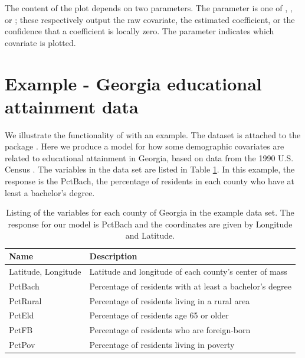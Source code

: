 The content of the plot depends on two parameters. The parameter  is one of , , or ; these respectively output the raw covariate, the estimated coefficient, or the confidence that a coefficient is locally zero. The parameter  indicates which covariate is plotted.

\section{Example - Georgia educational attainment data}
We illustrate the functionality of  with an example. The dataset  is attached to the package . Here we produce a model for how some demographic covariates are related to educational attainment in Georgia, based on data from the 1990 U.S. Census \citep{Fotheringham-Brundson-Charlton-2002}. The variables in the data set are listed in Table \ref{table:georgia-data}. In this example, the response is the PctBach, the percentage of residents in each county who have at least a bachelor's degree.

\begin{table}[h]
	\centering
	\begin{adjustbox}{max width=\textwidth}
	\begin{tabular}{ll}
	Name & Description \\
	\hline
	Latitude, Longitude & Latitude and longitude of each county's center of mass \\
	PctBach & Percentage of residents with at least a bachelor's degree\\
	PctRural & Percentage of residents living in a rural area\\
	PctEld & Percentage of residents age 65 or older\\
	PctFB & Percentage of residents who are foreign-born \\
	PctPov & Percentage of residents living in poverty \\
	\end{tabular}
	\end{adjustbox}
	\caption{Listing of the variables for each county of Georgia in the example data set. The response for our model is PctBach and the coordinates are given by Longitude and Latitude.
	\label{table:georgia-data}}
\end{table}

